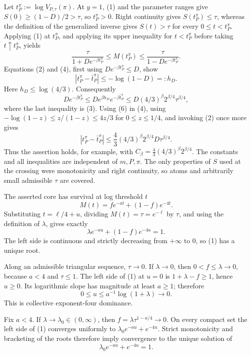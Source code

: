 Let \(t_P^\pi:=\log V_{P,\tau}(\pi)\).  At \(y=1\), (1) and the parameter ranges give \(S(0)\geq(1-D)/2>\tau\), so \(t_P^\pi>0\).  Right continuity gives \(S(t_P^\pi)\leq\tau\), whereas the definition of the generalized inverse gives \(S(t)>\tau\) for every \(0\leq t<t_P^\pi\).  Applying (1) at \(t_P^\pi\), and applying its upper inequality for \(t<t_P^\pi\) before taking \(t\uparrow t_P^\pi\), yields
\[
\frac{\tau}{1+De^{-\beta t_P^\pi}}
\leq M(t_P^\pi)
\leq\frac{\tau}{1-De^{-\beta t_P^\pi}}.                                \tag{4}
\]
Equations (2) and (4), first using \(De^{-\beta t_P^\pi}\leq D\), show
\[
|t_P^\pi-\bar t_P^\pi|\leq -\log(1-D)=:h_D.                             \tag{5}
\]
Here \(h_D\leq\log(4/3)\).  Consequently
\[
De^{-\beta t_P^\pi}
\leq D e^{\beta h_D}e^{-\beta\bar t_P^\pi}
\leq D(4/3)^\beta 2^{\beta/4}\tau^{\beta/4},                           \tag{6}
\]
where the last inequality is (3).  Using (6) in (4), using \(-\log(1-z)\leq z/(1-z)\leq4z/3\) for \(0\leq z\leq1/4\), and invoking (2) once more gives
\[
|t_P^\pi-\bar t_P^\pi|
\leq \frac43(4/3)^\beta2^{\beta/4}D\tau^{\beta/4}.
\]
Thus the assertion holds, for example, with \(C_\beta=\frac43(4/3)^\beta2^{\beta/4}\).  The constants and all inequalities are independent of \(m,P,\pi\).  The only properties of \(S\) used at the crossing were monotonicity and right continuity, so atoms and arbitrarily small admissible \(\tau\) are covered.

The asserted core has survival at log threshold \(t\)
\[
M(t)=f e^{-at}+(1-f)e^{-4t}.
\]
Substituting \(t=\ell/4+u\), dividing \(M(t)=\tau=e^{-\ell}\) by \(\tau\), and using the definition of \(\lambda\), gives exactly
\[
\lambda e^{-au}+(1-f)e^{-4u}=1.                                         \tag{1}
\]
The left side is continuous and strictly decreasing from \(+\infty\) to \(0\), so (1) has a unique root.

Along an admissible triangular sequence, \(\tau\to0\).  If \(\lambda\to0\), then \(0<f\leq\lambda\to0\), because \(a<4\) and \(\tau\leq1\).  The left side of (1) at \(u=0\) is \(1+\lambda-f\geq1\), hence \(u\geq0\).  Its logarithmic slope has magnitude at least \(a\geq1\); therefore
\[
0\leq u\leq a^{-1}\log(1+\lambda)\longrightarrow0.
\]
This is collective exponent-four dominance.

Fix \(a<4\).  If \(\lambda\to\lambda_0\in(0,\infty)\), then \(f=\lambda\tau^{1-a/4}\to0\).  On every compact set the left side of (1) converges uniformly to \(\lambda_0e^{-au}+e^{-4u}\).  Strict monotonicity and bracketing of the roots therefore imply convergence to the unique solution of
\[
\lambda_0e^{-au}+e^{-4u}=1.
\]

